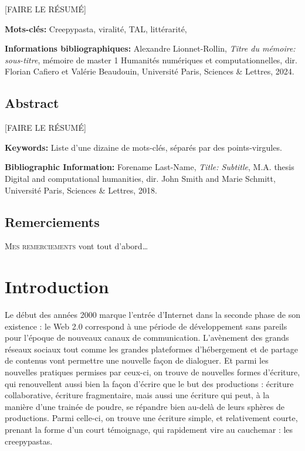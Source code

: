 \documentclass[12pt,a4paper,oneside,titlepage]{book} %
\begin{document}
[FAIRE LE RÉSUMÉ]

\medskip

\textbf{Mots-clés:} Creepypasta, viralité, TAL, littérarité, 

\textbf{Informations bibliographiques:} Alexandre Lionnet-Rollin, \textit{Titre du mémoire: sous-titre}, mémoire de master 1 \og Humanités numériques et computationnelles\fg{}, dir. Florian Cafiero et Valérie Beaudouin, Université Paris, Sciences \& Lettres, 2024.


\section*{Abstract}

[FAIRE LE RÉSUMÉ]

\medskip

\textbf{Keywords:} Liste d'une dizaine de mots-clés, séparés par des points-virgules.

\textbf{Bibliographic Information:} Forename Last-Name, \textit{Title: Subtitle}, M.A. thesis \og Digital and computational humanities\fg{}, dir. John Smith  and Marie Schmitt, Université Paris, Sciences \& Lettres, 2018.


\clearpage
\thispagestyle{empty}
\cleardoublepage


\section*{Remerciements}

\lettrine{M}{es remerciements} vont tout d'abord…


\clearpage

\thispagestyle{empty}
\cleardoublepage

\tableofcontents

\chapter*{Introduction}

Le début des années 2000 marque l’entrée d’Internet dans la seconde phase de son existence : le Web 2.0 correspond à une période de développement sans pareils pour l’époque de nouveaux canaux de communication. L’avènement des grands réseaux sociaux tout comme les grandes plateformes d’hébergement et de partage de contenus vont permettre une nouvelle façon de dialoguer. Et parmi les nouvelles pratiques permises par ceux-ci, on trouve de nouvelles formes d'écriture, qui renouvellent aussi bien la façon d’écrire que le but des productions : écriture collaborative, écriture fragmentaire, mais aussi une écriture qui peut, à la manière d'une trainée de poudre, se répandre bien au-delà de leurs sphères de productions. Parmi celle-ci, on trouve une écriture simple, et relativement courte, prenant la forme d'un court témoignage, qui rapidement vire au cauchemar : les creepypastas. 
	
\end{document}
